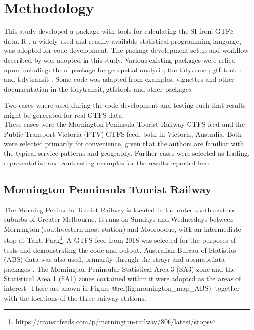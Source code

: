 \documentclass[preprint, 3p,
authoryear]{elsarticle} %
\begin{document}
\hypertarget{methodology}{%
\section{Methodology}\label{methodology}}

This study developed a package with tools for calculating the SI from
GTFS data. R \citep{R-base}, a widely used and readily available
statistical programming language, was adopted for code development. The
package development setup and workflow described by \citet{wickham2023r}
was adopted in this study. Various existing packages were relied upon
including: the sf package \citep{R-sf} for geospatial analysis; the
tidyverse \citep{tidyverse2019}; gtfstools \citep{R-gtfstools}; and
tidytransit \citep{R-tidytransit}. Some code was adapted from examples,
vignettes and other documentation in the tidytransit, gtfstools and
other packages.

Two cases where used during the code development and testing such that
results might be generated for real GTFS data.\\
These cases were the Mornington Peninsula Tourist Railway GTFS feed and
the Public Transport Victoria (PTV) GTFS feed, both in Victoria,
Australia. Both were selected primarily for convenience, given that the
authors are familiar with the typical service patterns and geography.
Further cases were selected as leading, representative and contrasting
examples for the results reported here.

\hypertarget{mornington-penninsula-tourist-railway}{%
\subsection{Mornington Penninsula Tourist
Railway}\label{mornington-penninsula-tourist-railway}}

The Morning Peninsula Tourist Railway is located in the outer
south-eastern suburbs of Greater Melbourne. It runs on Sundays and
Wednesdays between Mornington (southwestern-most station) and Moorooduc,
with an intermediate stop at Tanti Park\footnote{https://transitfeeds.com/p/mornington-railway/806/latest/stops}.
A GTFS feed from 2018 was selected for the purposes of tests and
demonstrating the code and output. Australian Bureau of Statistics (ABS)
data was also used, primarily through the strayr and absmapsdata
packages \citep{r-strayr}. The Mornington Peninsular Statistical Area 3
(SA3) zone and the Statistical Area 1 (SA1) zones contained within it
were adopted as the areas of interest. These are shown in Figure
@ref(fig:mornington\_map\_ABS), together with the locations of the three
railway stations.
\end{document}
